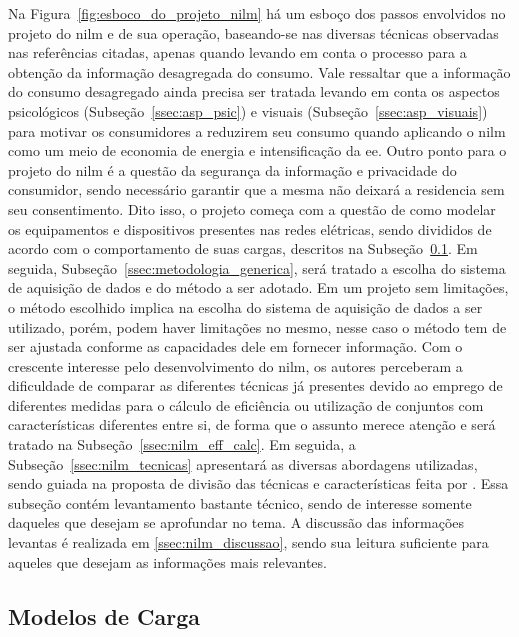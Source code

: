 Na Figura~\ref{fig:esboco_do_projeto_nilm} há um esboço dos passos
envolvidos no projeto do \acs{nilm} e de sua operação, baseando-se nas
diversas técnicas observadas nas referências citadas, apenas quando
levando em conta o processo para a obtenção da informação desagregada
do consumo. Vale ressaltar que a informação do consumo desagregado
ainda precisa ser tratada levando em conta os aspectos psicológicos
(Subseção~\ref{ssec:asp_psic}) e visuais
(Subseção~\ref{ssec:asp_visuais}) para motivar os consumidores a
reduzirem seu consumo quando aplicando o \acs{nilm} como um meio de
economia de energia e intensificação da \gls{ee}. Outro ponto para o
projeto do \acs{nilm} é a questão da segurança da
informação e privacidade do consumidor, sendo necessário garantir que
a mesma não deixará a residencia sem seu consentimento. Dito isso, o
projeto começa com a questão de como modelar os equipamentos e
dispositivos presentes nas redes elétricas, sendo divididos de acordo
com o comportamento de suas cargas, descritos na
Subseção~\ref{ssec:modelos_carga}. Em seguida,
Subseção~\ref{ssec:metodologia_generica}, será tratado a escolha
do sistema de aquisição de dados e do método a ser adotado. Em um
projeto sem limitações, o método escolhido implica na escolha do
sistema de aquisição de dados a ser utilizado, porém, podem haver
limitações no mesmo, nesse caso o método tem de ser ajustada
conforme as capacidades dele em fornecer informação. Com o crescente
interesse pelo desenvolvimento do \acs{nilm}, os autores perceberam a
dificuldade de comparar as diferentes técnicas já presentes devido ao
emprego de diferentes medidas para o cálculo de eficiência ou
utilização de conjuntos com características diferentes entre si, de
forma que o assunto merece atenção e será tratado na
Subseção~\ref{ssec:nilm_eff_calc}. Em seguida, a
Subseção~\ref{ssec:nilm_tecnicas} apresentará as diversas
abordagens utilizadas, sendo guiada na proposta de divisão das
técnicas e características feita por \cite{nilm_zeifman_review_2011}.
Essa subseção contém levantamento bastante técnico, sendo de
interesse somente daqueles que desejam se aprofundar no tema.  A
discussão das informações levantas é realizada em
\ref{ssec:nilm_discussao}, sendo sua leitura suficiente para
aqueles que desejam as informações mais relevantes.

\subsection{Modelos de Carga}
\label{ssec:modelos_carga}

